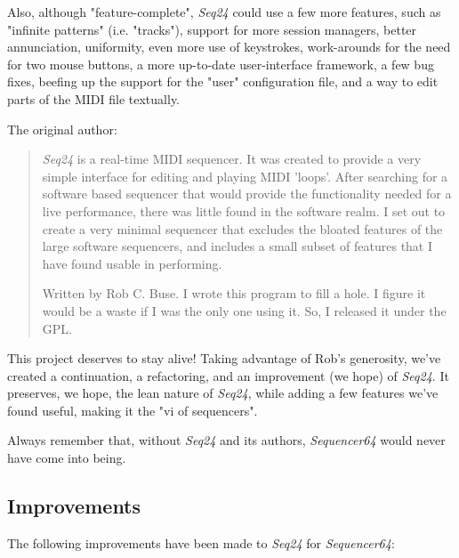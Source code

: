 \documentclass[
 11pt,
 twoside,
 a4paper,
 headinclude,
 footinclude,
 final                                 %
]{article}
\begin{document}
   Also, although "feature-complete", \textsl{Seq24} could use a few more
   features, such as "infinite patterns" (i.e. "tracks"), support for more
   session managers, better annunciation, uniformity, even more use of
   keystrokes, work-arounds for the need for two mouse buttons, a more
   up-to-date user-interface framework, a few bug fixes, beefing up the support
   for the "user" configuration file, and a way to edit parts of the MIDI file
   textually.

   The original author:

   \begin{quotation}
      \textsl{Seq24} is a real-time MIDI sequencer. It was created to
      provide a very simple interface for editing and playing MIDI 'loops'.
      After searching for a software based sequencer that would provide the
      functionality needed for a live performance, there was little found in
      the software realm. I set out to create a very minimal sequencer that
      excludes the bloated features of the large software sequencers, and
      includes a small subset of features that I have found usable in
      performing. 

      Written by Rob C. Buse.  I wrote this program to fill a
      hole.  I figure it would be a waste if I was the only one
      using it.  So, I released it under the GPL.
   \end{quotation}

   This project deserves to stay alive!  Taking advantage of Rob's generosity,
   we've created a continuation, a refactoring, and an improvement (we hope) of
   \textsl{Seq24}.  It preserves, we hope, the lean nature of \textsl{Seq24},
   while adding a few features we've found useful, making it the "vi of
   sequencers".
   
   Always remember that, without \textsl{Seq24} and its authors,
   \textsl{Sequencer64} would never have come into being.

\subsection{Improvements}
\label{subsec:improvements}

   The following improvements have been made to \textsl{Seq24} for
   \textsl{Sequencer64}:
\end{document}
